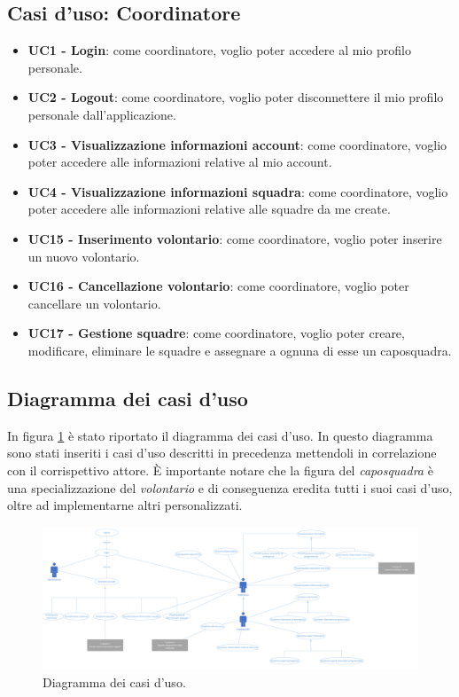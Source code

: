 \subsection{Casi d'uso: Coordinatore}
\begin{itemize}
	\item \textbf{UC1 - Login}:
	come coordinatore, voglio poter accedere al mio profilo personale.
	
	\item \textbf{UC2 - Logout}:
	come coordinatore, voglio poter disconnettere il mio profilo personale dall'applicazione.
	
	\item \textbf{UC3 - Visualizzazione informazioni account}:
	come coordinatore, voglio poter accedere alle informazioni relative al mio account.
	
	\item \textbf{UC4 - Visualizzazione informazioni squadra}:
	come coordinatore, voglio poter accedere alle informazioni relative alle squadre da me create.
	
	\item \textbf{UC15 - Inserimento volontario}:
	come coordinatore, voglio poter inserire un nuovo volontario.
	
	\item \textbf{UC16 - Cancellazione volontario}:
	come coordinatore, voglio poter cancellare un volontario.
	
	\item \textbf{UC17 - Gestione squadre}:
	come coordinatore, voglio poter creare, modificare, eliminare le squadre e assegnare a ognuna di esse un caposquadra.
\end{itemize}

\clearpage
\subsection{Diagramma dei casi d'uso}
In figura \ref{fig:UseCaseDiagram} è stato riportato il diagramma dei casi d'uso. In questo diagramma sono stati inseriti i casi d'uso descritti in precedenza mettendoli in correlazione con il corrispettivo attore. È importante notare che la figura del \textit{caposquadra} è una specializzazione del \textit{volontario} e di conseguenza eredita tutti i suoi casi d'uso, oltre ad implementarne altri personalizzati. 
\begin{landscape}
	\begin{figure}[b]
		\centering
		\includegraphics[width=1\linewidth]{./Iterazione 0/OtherFiles/Use cases diagram}
		\caption{Diagramma dei casi d'uso.}
		\label{fig:UseCaseDiagram}
	\end{figure}
\end{landscape}

